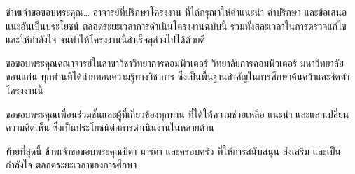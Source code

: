 %

ข้าพเจ้าขอขอบพระคุณ\ldots{} อาจารย์ที่ปรึกษาโครงงาน
ที่ได้กรุณาให้คำแนะนำ คำปรึกษา และข้อเสนอแนะอันเป็นประโยชน์
ตลอดระยะเวลาการดำเนินโครงงานฉบับนี้
รวมทั้งสละเวลาในการตรวจแก้ไขและให้กำลังใจ
จนทำให้โครงงานนี้สำเร็จลุล่วงไปได้ด้วยดี

ขอขอบพระคุณคณาจารย์ในสาขาวิชาวิทยาการคอมพิวเตอร์
วิทยาลัยการคอมพิวเตอร์ มหาวิทยาลัยขอนแก่น
ทุกท่านที่ได้ถ่ายทอดความรู้ทางวิชาการ
ซึ่งเป็นพื้นฐานสำคัญในการศึกษาค้นคว้าและจัดทำโครงงานนี้

ขอขอบพระคุณเพื่อนร่วมชั้นและผู้ที่เกี่ยวข้องทุกท่าน
ที่ได้ให้ความช่วยเหลือ แนะนำ และแลกเปลี่ยนความคิดเห็น
ซึ่งเป็นประโยชน์ต่อการดำเนินงานในหลายด้าน

ท้ายที่สุดนี้ ข้าพเจ้าขอขอบพระคุณบิดา มารดา และครอบครัว
ที่ให้การสนับสนุน ส่งเสริม และเป็นกำลังใจ
ตลอดระยะเวลาของการศึกษา

